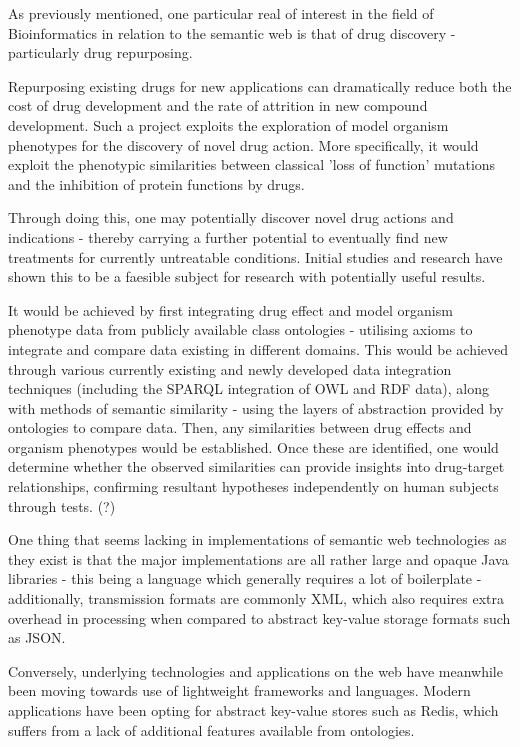 \documentclass{article}
\begin{document}

As previously mentioned, one particular real of interest in the field of
Bioinformatics in relation to the semantic web is that of drug discovery -
particularly drug repurposing\cite{pharmgkb}.

Repurposing existing drugs for new applications can dramatically reduce both
the cost of drug development and the rate of attrition in new compound
development. Such a project exploits the exploration of model organism
phenotypes for the discovery of novel drug action. More specifically, it would
exploit the phenotypic similarities between classical 'loss of function'
mutations and the inhibition of protein functions by drugs.

Through doing this, one may potentially discover novel drug actions and
indications - thereby carrying a further potential to eventually find new treatments for
currently untreatable conditions. Initial studies and research have shown this
to be a faesible subject for research with potentially useful
results.\cite{drugrepurposeinitial}

It would be achieved by first integrating drug effect and model organism
phenotype data from publicly available class ontologies - utilising axioms to
integrate and compare data existing in different domains. This would be achieved
through various currently existing and  newly developed data integration techniques 
(including the SPARQL integration of OWL and RDF data), along with methods of
semantic similarity - using the layers of abstraction provided by ontologies
to compare data. Then, any similarities between drug effects and organism
phenotypes would be established. Once these are identified, one would determine 
whether the observed similarities can provide insights into drug-target relationships, 
confirming resultant hypotheses independently on human subjects through tests.
(?)


One thing that seems lacking in implementations of semantic web technologies as
they exist is that the major implementations are all rather large and opaque
Java libraries - this being a language which generally requires a lot of
boilerplate - additionally, transmission formats are commonly XML, which also
requires extra overhead in processing when compared to abstract key-value
storage formats such as JSON. 

Conversely, underlying technologies and applications on the web have meanwhile 
been moving towards use of lightweight frameworks and languages. Modern applications 
have been opting for abstract key-value stores such as Redis, which suffers from
a lack of additional features available from ontologies. 
\end{document}
